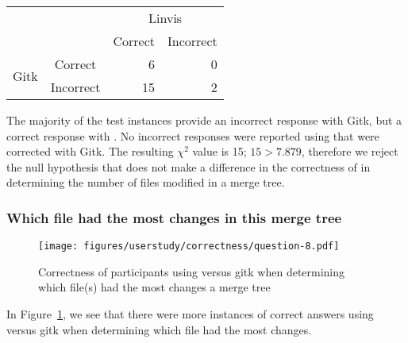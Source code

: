 


\begin{center}
  \begin{tabular}{cc|rr}
                           &           & \multicolumn{2}{c}{Linvis}\\
                           &           & Correct                      & Incorrect\\\hline
    \multirow{2}{*}{Gitk}  & Correct   & 6                            & 0\\
                           & Incorrect & 15                           & 2\\
  \end{tabular}
\end{center}

The majority of the test instances provide an incorrect response with
Gitk, but a correct response with \tool. No incorrect responses were
reported using \tool that were corrected with Gitk. The resulting
$\chi^2$ value is 15; $15 > 7.879$, therefore we reject the null
hypothesis that \tool does not make a difference in the correctness of
in determining the number of files modified in a merge tree.

\subsubsection{Which file had the most changes in this merge tree}
\label{ssub:which_file_had_the_most_changes_in_this_merge_tree}

\begin{figure}[htpb]
  \centering
  \texttt{[image: figures/userstudy/correctness/question-8.pdf]}
  \caption{Correctness of participants using \tool versus gitk when
    determining which file(s) had the most changes a merge tree}
  \label{fig:q_8_correctness}
\end{figure}

In Figure~\ref{fig:q_8_correctness}, we see that there were more
instances of correct answers using \tool versus gitk when determining
which file had the most changes.




